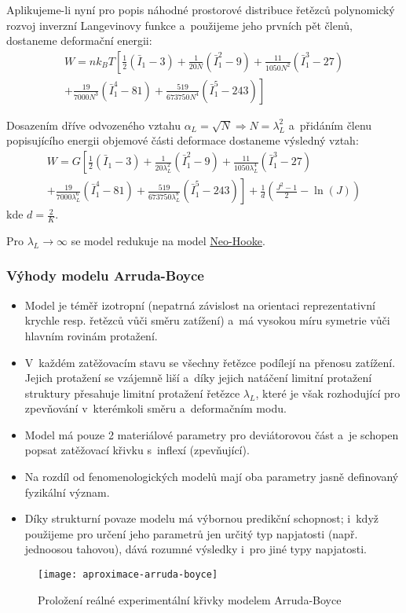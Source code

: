 Aplikujeme-li nyní pro popis náhodné prostorové distribuce řetězců polynomický rozvoj inverzní Langevinovy funkce a~použijeme jeho prvních pět členů, dostaneme deformační energii:
\begin{multline}
	W
	= n k_B T \left[ \frac{1}{2} (\bar{I}_1-3) + \frac{1}{20 N} (\bar{I}_1^2-9) + \frac{11}{1050 N^2} (\bar{I}_1^3-27) \right.\\
	\left. + \frac{19}{7000 N^3} (\bar{I}_1^4-81) + \frac{519}{673750 N^4} (\bar{I}_1^5-243) \right]
\end{multline}

Dosazením dříve odvozeného vztahu $\alpha_L = \sqrt{N} \Rightarrow N = \lambda_L^2$ a~přidáním členu popisujícího energii objemové části deformace dostaneme výsledný vztah:
\begin{multline}
	W
	= G \left[ \frac{1}{2} (\bar{I}_1-3) + \frac{1}{20 \lambda_L^2} (\bar{I}_1^2-9) + \frac{11}{1050 \lambda_L^4} (\bar{I}_1^3-27) \right.\\
	\left. + \frac{19}{7000 \lambda_L^6} (\bar{I}_1^4-81) + \frac{519}{673750 \lambda_L^8} (\bar{I}_1^5-243) \right]
	+ \frac{1}{d} \left(\frac{J^2 - 1}{2} - \ln(J)\right)
\end{multline}
kde $d=\frac{2}{K}$.

Pro $\lambda_L \rightarrow \infty$ se model redukuje na model \hyperref[sec:neo-hooke]{Neo-Hooke}.

\subsubsection{Výhody modelu Arruda-Boyce}
\begin{itemize}
	\item Model je téměř izotropní (nepatrná závislost na orientaci reprezentativní krychle resp. řetězců vůči směru zatížení) a~má vysokou míru symetrie vůči hlavním rovinám protažení.
	\item V~každém zatěžovacím stavu se všechny řetězce podílejí na přenosu zatížení. Jejich protažení se vzájemně liší a~díky jejich natáčení limitní protažení struktury přesahuje limitní protažení řetězce $\lambda_L$, které je však rozhodující pro zpevňování v~kterémkoli směru a~deformačním modu.
	\item Model má pouze 2 materiálové parametry pro deviátorovou část a~je schopen popsat zatěžovací křivku s~inflexí (zpevňující).
	\item Na rozdíl od fenomenologických modelů mají oba parametry jasně definovaný fyzikální význam.
	\item Díky strukturní povaze modelu má výbornou predikční schopnost; i~když použijeme pro určení jeho parametrů jen určitý typ napjatosti (např. jednoosou tahovou), dává rozumné výsledky i~pro jiné typy napjatosti.
\end{itemize}

\begin{figure}[H]
	\centering
	\texttt{[image: aproximace-arruda-boyce]}
	\caption{Proložení reálné experimentální křivky modelem Arruda-Boyce}
	\label{fig:aproximace-arruda-boyce}
\end{figure}
